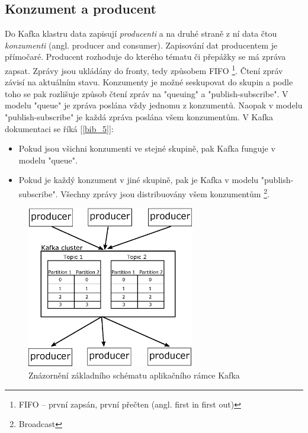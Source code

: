 \documentclass[
  digital, %
  table,   %
  nolof,     %
  nolot,     %
  oneside, %
  nocover,
  monochrome,
  12pt
]{fithesis3}
\begin{document}
\subsection*{Konzument a producent}

Do Kafka klastru data zapisují \textit{producenti} a na druhé straně z ní data čtou \textit{konzumenti} (angl. producer and consumer). Zapisování dat producentem je přímočaré. Producent rozhoduje do kterého tématu či přepážky se má zpráva zapsat. Zprávy jsou ukládány do fronty, tedy způsobem FIFO \footnote{FIFO -- první zapsán, první přečten (angl. first in first out)}. Čtení zpráv závisí na aktuálním stavu. Konzumenty je možné seskupovat do skupin a podle toho se pak rozlišuje způsob čtení zpráv na "queuing" a "publish-subscribe". V modelu "queue" je zpráva poslána vždy jednomu z konzumentů. Naopak v modelu "publish-subscribe" je každá zpráva poslána všem konzumentům. V Kafka dokumentaci se říká [\ref{bib_5}]:
\begin{itemize}
  \item Pokud jsou všichni konzumenti ve stejné skupině, pak Kafka funguje v modelu "queue".
  \item Pokud je každý konzument v jiné skupině, pak je Kafka v modelu "publish-subscribe". Všechny zprávy jsou distribuovány všem konzumentům \footnote{Broadcast}.
\end{itemize}

\begin{figure}[H]
	\centering
    \includegraphics[width=0.65\textwidth, height=0.45\textheight]{images/kafka.eps}
    \caption{Znázornění základního schématu aplikačního rámce Kafka}
    \label{fig:kafka}
\end{figure}
\end{document}
